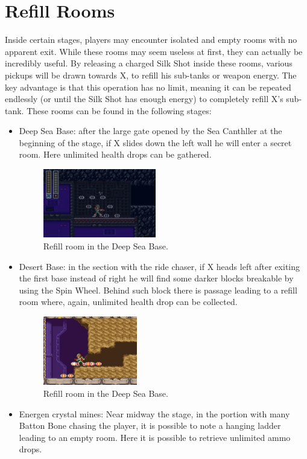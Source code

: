 \section{Refill Rooms}\label{sec:refill}
Inside certain stages, players may encounter isolated and empty rooms with no apparent exit. While these rooms may seem useless at first, they can actually be incredibly useful. By releasing a charged Silk Shot inside these rooms, various pickups will be drawn towards X, to refill his sub-tanks or weapon energy. The key advantage is that this operation has no limit, meaning it can be repeated endlessly (or until the Silk Shot has enough energy) to completely refill X's sub-tank. These rooms can be found in the following stages:
\begin{itemize}
	\item Deep Sea Base: after the large gate opened by the Sea Canthller at the beginning of the stage, if X slides down the left wall he will enter a secret room. Here unlimited health drops can be gathered.
	\begin{figure}[htp]
		\centering
		\includegraphics[height=3cm]{figures/X2/Bubble_crab/Crab_farming_spot.png}
		\caption{Refill room in the Deep Sea Base.}
	\end{figure}
	\item Desert Base: in the section with the ride chaser, if X heads left after exiting the first base instead of right he will find some darker blocks breakable by using the Spin  Wheel. Behind such block there is passage leading to a refill room where, again, unlimited health drop can be collected.
	\begin{figure}[htp]
		\centering
		\includegraphics[height=3cm]{figures/X2/Overdrive_ostrich/ostrich_refill.jpg}
		\caption{Refill room in the Deep Sea Base.}
	\end{figure}
	\item Energen crystal mines: Near midway the stage, in the portion with many Batton Bone chasing the player, it is possible to note a hanging ladder leading to an empty room. Here it is possible to retrieve unlimited ammo drops.

\end{itemize}
